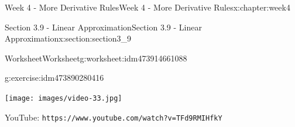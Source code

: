 \documentclass[oneside,10pt,]{book}
\newcommand{\mono}[1]{\texttt{#1}}
\numberwithin{equation}{section}
\newlength{\qrsize}
\newlength{\previewwidth}
\begin{document}
\begin{chapterptx}{Week 4 - More Derivative Rules}{}{Week 4 - More Derivative Rules}{}{}{x:chapter:week4}
\begin{sectionptx}{Section 3.9 - Linear Approximation}{}{Section 3.9 - Linear Approximation}{}{}{x:section:section3_9}
\begin{worksheet-subsection}{Worksheet}{}{Worksheet}{}{}{g:worksheet:idm473914661088}
\begin{divisionexercise}{2}{}{}{g:exercise:idm473890280416}
\end{divisionexercise}%
\end{worksheet-subsection}
\restoregeometry
\setlength{\qrsize}{9em}
\setlength{\previewwidth}{\linewidth}
\addtolength{\previewwidth}{-\qrsize}
\begin{tcbraster}[raster columns=2, raster column skip=1pt, raster halign=center, raster force size=false, raster left skip=0pt, raster right skip=0pt]%
\begin{tcolorbox}[previewstyle, width=\previewwidth]%
\texttt{[image: images/video-33.jpg]}%
\end{tcolorbox}%
\begin{tcolorbox}[qrstyle]%
{\hypersetup{urlcolor=black}}%
\end{tcolorbox}%
\begin{tcolorbox}[captionstyle]%
\small YouTube: \mono{https://www.youtube.com/watch?v=TFd9RMIHfkY}\end{tcolorbox}%
\end{tcbraster}%
\end{sectionptx}
\end{chapterptx}
%
%
\typeout{************************************************}
\typeout{************************************************}
%
\end{document}
